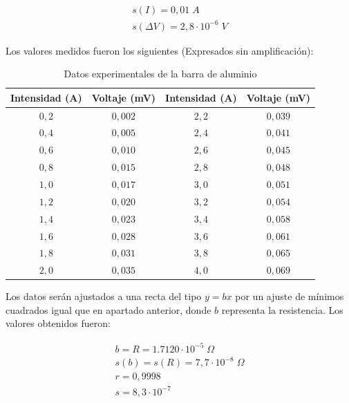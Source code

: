 \documentclass[a4paper,12pt,titlepage]{report}
\begin{document}
\begin{equation}
    \begin{gathered}
    s(I) = 0,01 \; A\\    
    s(\Delta V) = 2,8 \cdot 10^{-6} \; V
    \end{gathered}
\end{equation}

\newpage

Los valores medidos fueron los siguientes (Expresados sin amplificación):

\begin{table}[h!]
    \centering
    \begin{tabular}{|c|c|c|c|}
        \hline
        Intensidad (A) & Voltaje (mV) & Intensidad (A) & Voltaje (mV) \\
        \hline
        $0,2$ & $0,002$ & $2,2$ & $0,039$ \\
        \hline
        $0,4$ & $0,005$ & $2,4$ & $0,041$ \\
        \hline
        $0,6$ & $0,010$ & $2,6$ & $0,045$ \\
        \hline
        $0,8$ & $0,015$ & $2,8$ & $0,048$ \\
        \hline
        $1,0$ & $0,017$ & $3,0$ & $0,051$ \\
        \hline
        $1,2$ & $0,020$ & $3,2$ & $0,054$ \\
        \hline
        $1,4$ & $0,023$ & $3,4$ & $0,058$ \\
        \hline
        $1,6$ & $0,028$ & $3,6$ & $0,061$ \\
        \hline
        $1,8$ & $0,031$ & $3,8$ & $0,065$ \\
        \hline
        $2,0$ & $0,035$ & $4,0$ & $0,069$ \\
        \hline
    \end{tabular}
    \caption{Datos experimentales de la barra de aluminio}
\end{table}

Los datos serán ajustados a una recta del tipo $y=bx$ por un ajuste de mínimos cuadrados igual que en apartado anterior, donde $b$ representa la resistencia. Los valores obtenidos fueron:

\begin{equation}
    \begin{gathered}
        b = R = 1.7120 \cdot 10^{-5} \; \Omega \\
        s(b) = s(R) = 7,7 \cdot 10^{-8} \; \Omega\\
        r = 0,9998 \\
        s = 8,3\cdot 10^{-7}
    \end{gathered}
\end{equation}
\end{document}
